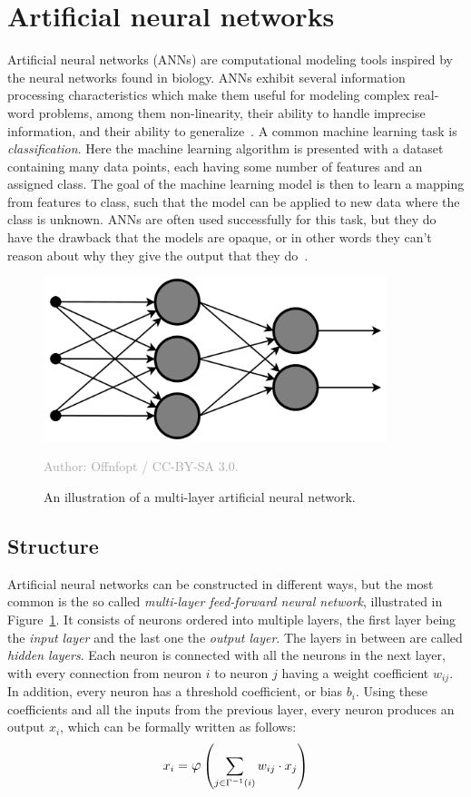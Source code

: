 \documentclass{kththesis}
\newcommand{\source}[1]{\vspace{-5mm}\caption*{\textcolor{darkgray}{Author: {#1}}\vspace{-7mm}} }
\begin{document}
\section{Artificial neural networks}
Artificial neural networks (ANNs) are computational modeling tools inspired by the neural networks found in biology. ANNs exhibit several information processing characteristics which make them useful for modeling complex real-word problems, among them non-linearity, their ability to handle imprecise information, and their ability to generalize~\cite{ANNFundamentals}. A common machine learning task is \textit{classification}. Here the machine learning algorithm is presented with a dataset containing many data points, each having some number of features and an assigned class. The goal of the machine learning model is then to learn a mapping from features to class, such that the model can be applied to new data where the class is unknown. ANNs are often used successfully for this task, but they do have the drawback that the models are opaque, or in other words they can't reason about why they give the output that they do~\cite[p. 3, 8--9]{weiss1990empirical}.

\begin{figure}
  \begin{center}
    \includegraphics[width=100mm]{img/neural_network.png}
    \caption{An illustration of a multi-layer artificial neural network. }
    \source{Offnfopt / CC-BY-SA 3.0.}
    \label{fig:mlf}
  \end{center}
\end{figure}

\subsection{Structure}
Artificial neural networks can be constructed in different ways, but the most common is the so called \textit{multi-layer feed-forward neural network}, illustrated in Figure~\ref{fig:mlf}. It consists of neurons ordered into multiple layers, the first layer being the \textit{input layer} and the last one the \textit{output layer}. The layers in between are called \textit{hidden layers}. Each neuron is connected with all the neurons in the next layer, with every connection from neuron $i$ to neuron $j$ having a weight coefficient $w_{ij}$. In addition, every neuron has a threshold coefficient, or bias $b_i$. Using these coefficients and all the inputs from the previous layer, every neuron produces an output $x_i$, which can be formally written as follows:
\[x_i = \mathlarger{\varphi}\left(\sum_{j \in \Gamma^{-1}(i)}{w_{ij} \cdot x_j}\right)\]
\end{document}

